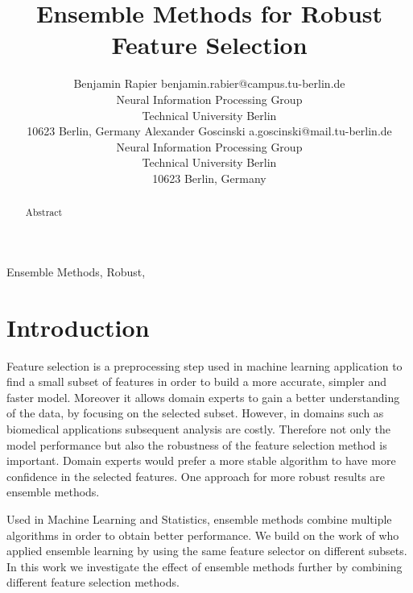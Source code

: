 \documentclass[twoside,11pt]{article}
\begin{document}
\title{Ensemble Methods for Robust Feature Selection}

\author{\name Benjamin Rapier \email benjamin.rabier@campus.tu-berlin.de \\
       \addr Neural Information Processing Group\\
       Technical University Berlin\\
       10623 Berlin, Germany
       \AND
       \name Alexander Goscinski \email a.goscinski@mail.tu-berlin.de \\
       \addr Neural Information Processing Group\\
       Technical University Berlin\\
       10623 Berlin, Germany}


\maketitle

\begin{abstract}%
  Abstract
\end{abstract}

\begin{keywords}
  Ensemble Methods, Robust, 
\end{keywords}

\section{Introduction}

Feature selection is a preprocessing step used in machine learning application to find a small subset of features in order to build a more accurate, simpler and faster model. Moreover it allows domain experts to gain a better understanding of the data, by focusing on the selected subset. However, in domains such as biomedical applications subsequent analysis are costly. Therefore not only the model performance but also the robustness of the feature selection method is important. Domain experts would prefer a more stable algorithm to have more confidence in the selected features. One approach for more robust results are ensemble methods.

Used in Machine Learning and Statistics, ensemble methods combine multiple algorithms in order to obtain better performance. We build on the work of \cite{saeys2008} who applied ensemble learning by using the same feature selector on different subsets. In this work we investigate the effect of ensemble methods further by combining different feature selection methods. 
\end{document}

